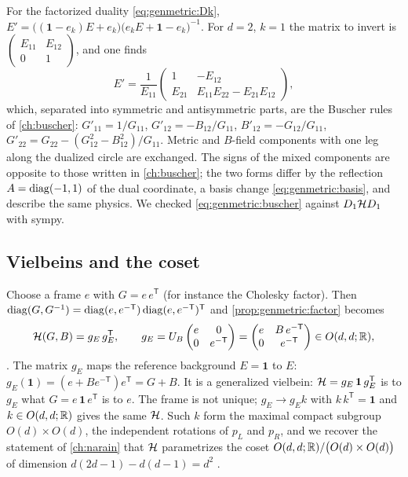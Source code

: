 For the factorized duality \eqref{eq:genmetric:Dk},
$E'=\big((\mathbf 1-e_k)E+e_k\big)\big(e_kE+\mathbf 1-e_k\big)^{-1}$. For $d=2$, $k=1$ the
matrix to invert is $\left(\begin{smallmatrix}E_{11}&E_{12}\\0&1\end{smallmatrix}\right)$,
and one finds
\begin{equation}\label{eq:genmetric:buscher}
 E'=\frac1{E_{11}}\begin{pmatrix}1&-E_{12}\\[2pt]E_{21}&E_{11}E_{22}-E_{21}E_{12}\end{pmatrix},
\end{equation}
which, separated into symmetric and antisymmetric parts, are the Buscher rules of
\cref{ch:buscher}: $G'_{11}=1/G_{11}$, $G'_{12}=-B_{12}/G_{11}$, $B'_{12}=-G_{12}/G_{11}$,
$G'_{22}=G_{22}-(G_{12}^2-B_{12}^2)/G_{11}$. Metric and $B$-field components with one leg
along the dualized circle are exchanged. The signs of the mixed components are opposite to
those written in \cref{ch:buscher}; the two forms differ by the reflection
$A=\operatorname{diag}(-1,1)$ of the dual coordinate, a basis change \eqref{eq:genmetric:basis}, and
describe the same physics. We checked \eqref{eq:genmetric:buscher} against
$D_1\mathcal{H} D_1$ with sympy.

\subsection{Vielbeins and the coset}\label{sec:genmetric:coset}

Choose a frame $e$ with $G=e\,e^{\mathsf T}$ (for instance the Cholesky factor). Then
$\operatorname{diag}(G,G^{-1})=\operatorname{diag}(e,e^{-\mathsf T})\operatorname{diag}(e,e^{-\mathsf T})^{\mathsf T}$ and
\cref{prop:genmetric:factor} becomes
\begin{equation}\label{eq:genmetric:vielbein}
 \mathcal{H}(G,B)=g_E\,g_E^{\mathsf T},\qquad
 g_E=U_B\begin{pmatrix}e&0\\0&e^{-\mathsf T}\end{pmatrix}
 =\begin{pmatrix}e&B\,e^{-\mathsf T}\\0&e^{-\mathsf T}\end{pmatrix}\in O(d,d;\mathbb{R}),
\end{equation}
. The matrix $g_E$ maps the reference background $E=\mathbf 1$ to $E$:
$g_E(\mathbf 1)=(e+Be^{-\mathsf T})e^{\mathsf T}=G+B$. It is a generalized
vielbein: $\mathcal{H}=g_E\,\mathbf 1\,g_E^{\mathsf T}$ is to $g_E$ what
$G=e\,\mathbf 1\,e^{\mathsf T}$ is to $e$. The frame is not unique; $g_E\to g_Ek$ with
$k\,k^{\mathsf T}=\mathbf 1$ and $k\in O(d,d;\mathbb{R})$ gives the same $\mathcal{H}$. Such $k$ form the
maximal compact subgroup $O(d)\times O(d)$, the independent rotations of $p_L$ and $p_R$,
and we recover the statement of \cref{ch:narain} that $\mathcal{H}$ parametrizes the coset
$O(d,d;\mathbb{R})/\big(O(d)\times O(d)\big)$ of dimension $d(2d-1)-d(d-1)=d^2$
.

